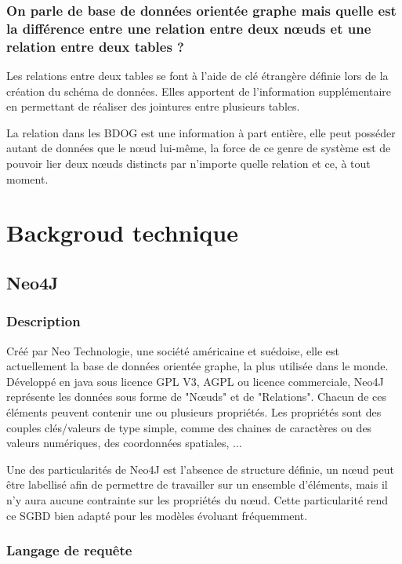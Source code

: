 \documentclass[a4paper,fleqn,12pt]{report}
\begin{document}
\subsection*{On parle de base de données orientée graphe mais quelle est la différence entre une relation entre deux nœuds et une relation entre deux tables ?}
Les relations entre deux tables se font à l’aide de clé étrangère définie lors de la création du schéma de données. Elles apportent de l’information supplémentaire en permettant de réaliser des jointures entre plusieurs tables.

La relation dans les BDOG est une information à part entière, elle peut posséder autant de données que le nœud lui-même, la force de ce genre de système est de pouvoir lier deux nœuds distincts par n’importe quelle relation et ce, à tout moment.

\chapter{Backgroud technique}
\section{Neo4J}

\subsection{Description}

Créé par Neo Technologie, une société américaine et suédoise, elle est actuellement la base de données orientée graphe, la plus utilisée dans le monde\cite{DBEnginesSite}. Développé en java sous licence GPL V3, AGPL ou licence commerciale, Neo4J représente les données sous forme de "Nœuds" et de "Relations". Chacun de ces éléments peuvent contenir une ou plusieurs propriétés. Les propriétés sont des couples clés/valeurs de type simple, comme des chaines de caractères ou des valeurs numériques, des coordonnées spatiales, ... \cite{Neo4JSite}

Une des particularités de Neo4J est l’absence de structure définie, un nœud peut être labellisé afin de permettre de travailler sur un ensemble d’éléments, mais il n’y aura aucune contrainte sur les propriétés du nœud. Cette particularité rend ce SGBD bien adapté pour les modèles évoluant fréquemment.


\subsection{Langage de requête}
\end{document}

